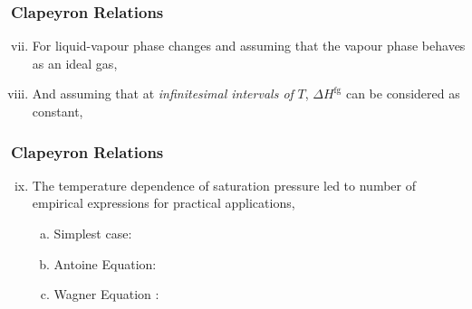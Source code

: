 \documentclass[10pt,compress,unknownkeysallowed]{beamer}
\begin{document}
\begin{frame}
  \frametitle{Clapeyron Relations}
     \begin{enumerate}[i)]\setcounter{enumi}{6}
         \item<1-> For liquid-vapour phase changes and assuming that the vapour phase behaves as an ideal gas, 
         \item<2-> And assuming that at {\it infinitesimal intervals of } $T$, $\Delta H^{\text{fg}}$ can be considered as constant,
     \end{enumerate}

\end{frame}
\normalsize


\begin{frame}
  \frametitle{Clapeyron Relations}
     \begin{enumerate}[i)]\setcounter{enumi}{8}
         \item<1-> The temperature dependence of saturation pressure led to number of empirical expressions for practical applications, \eg
         \begin{enumerate}[a)]
            \item<2-> Simplest case:
            \item<3-> Antoine Equation:
            \item<4-> Wagner Equation :
         \end{enumerate}
     \end{enumerate}

\end{frame}
\normalsize
\end{document}
